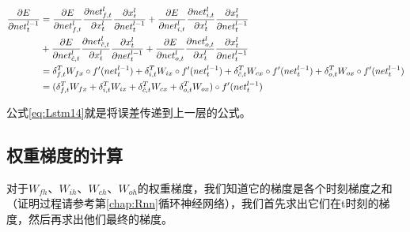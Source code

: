 \begin{align}
	\frac{\partial{E}}{\partial{{net}_t^{l-1}}} & =\frac{\partial{E}}{\partial{{{net}_{f,t}^l}}}\frac{\partial{{{net}_{f,t}^l}}}{\partial{{x}_t^l}}\frac{\partial{{x}_t^l}}{\partial{{{net}_t^{l-1}}}}
	+\frac{\partial{E}}{\partial{{{net}_{i,t}^l}}}\frac{\partial{{{net}_{i,t}^l}}}{\partial{{x}_t^l}}\frac{\partial{{x}_t^l}}{\partial{{{net}_t^{l-1}}}}
	\notag                                                                                                                                                                                                                                       \\&+\frac{\partial{E}}{\partial{{{net}_{\tilde{c},t}^l}}}\frac{\partial{{{net}_{\tilde{c},t}^l}}}{\partial{{x}_t^l}}\frac{\partial{{x}_t^l}}{\partial{{{net}_t^{l-1}}}}
	+\frac{\partial{E}}{\partial{{{net}_{o,t}^l}}}\frac{\partial{{{net}_{o,t}^l}}}{\partial{{x}_t^l}}\frac{\partial{{x}_t^l}}{\partial{{{net}_t^{l-1}}}}\notag                                                                                   \\
	                                            & =\delta_{f,t}^TW_{fx}\circ f'({net}_t^{l-1})+\delta_{i,t}^TW_{ix}\circ f'({net}_t^{l-1})+\delta_{\tilde{c},t}^TW_{cx}\circ f'({net}_t^{l-1})+\delta_{o,t}^TW_{ox}\circ f'({net}_t^{l-1})\notag \\
	                                            & =(\delta_{f,t}^TW_{fx}+\delta_{i,t}^TW_{ix}+\delta_{\tilde{c},t}^TW_{cx}+\delta_{o,t}^TW_{ox})\circ f'({net}_t^{l-1})\label{eq:Lstm14}
\end{align}

公式\ref{eq:Lstm14}就是将误差传递到上一层的公式。



\subsection{权重梯度的计算}\label{Lstm:8}

对于\(W_{fh}\)、\(W_{ih}\)、\(W_{ch}\)、\(W_{oh}\)的权重梯度，我们知道它的梯度是各个时刻梯度之和（证明过程请参考第\ref{chap:Rnn}循环神经网络），我们首先求出它们在t时刻的梯度，然后再求出他们最终的梯度。

